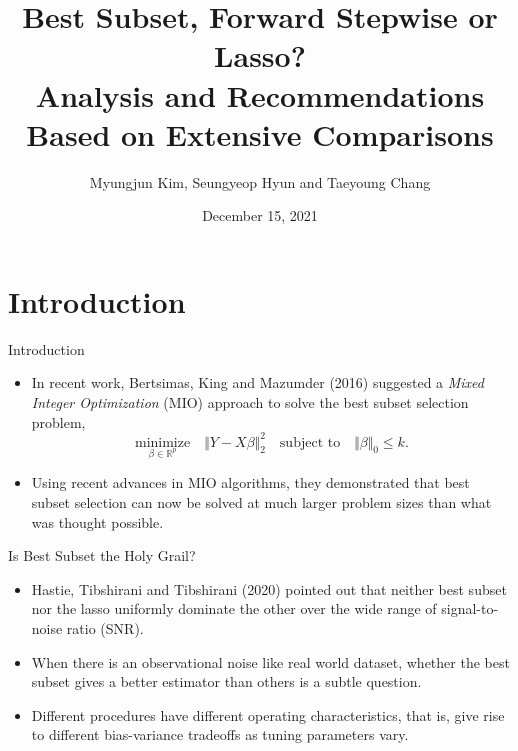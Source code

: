\documentclass[blue, 10pt]{beamer}
\title{Best Subset, Forward Stepwise or Lasso?\\ Analysis and Recommendations Based on Extensive Comparisons}
\author{Myungjun Kim, Seungyeop Hyun and Taeyoung Chang}
\date{December 15, 2021}
\institute{Seoul National University}
\begin{document}
\maketitle
\section{Introduction}


\begin{frame}{Introduction}

  \begin{itemize}
    \item In recent work, Bertsimas, King and Mazumder (2016) suggested a \textit{Mixed Integer Optimization} (MIO) approach to solve the best subset selection problem,
    $$\underset{\beta \in \mathbb{R}^p}{\text{minimize}} \quad \Vert Y - X \beta \Vert_2^2 \quad \text{subject to} \quad \Vert \beta \Vert_0 \le k.$$
    \item Using recent advances in MIO algorithms, they demonstrated that best subset selection can now be solved at much larger problem sizes than what was thought possible.
  \end{itemize}
  
\end{frame}
  
  
\begin{frame}{Is Best Subset the Holy Grail?}
  
  \begin{itemize}
    \item Hastie, Tibshirani and Tibshirani (2020) pointed out that neither best subset nor the lasso uniformly dominate the other over the wide range of signal-to-noise ratio (SNR).
    \item When there is an observational noise like real world dataset, whether the best subset gives a better estimator than others is a subtle question.
    \item Different procedures have different operating characteristics, that is, give rise to different bias-variance tradeoffs as tuning parameters vary.
  \end{itemize}
    
\end{frame}
\end{document}
